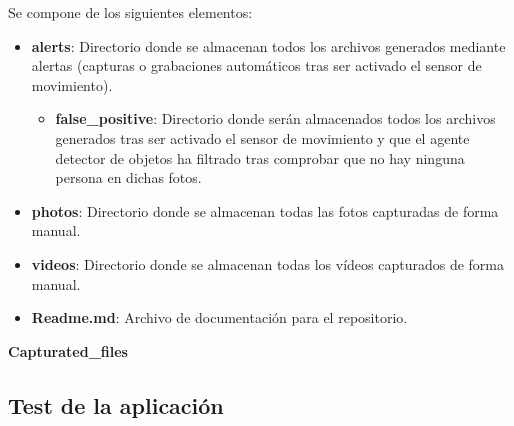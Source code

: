 Se compone de los siguientes elementos:

\vspace{-0.5cm}

\begin{itemize}
\item \textbf{alerts}: Directorio donde se almacenan todos los archivos generados mediante alertas (capturas o grabaciones automáticos tras ser activado el sensor de movimiento).

	\begin{itemize}
	\item \textbf{false\_positive}: Directorio donde serán almacenados todos los archivos generados tras ser activado el sensor de movimiento y que el agente detector de objetos ha filtrado tras comprobar que no hay ninguna persona en dichas fotos.
	\end{itemize}

\item \textbf{photos}: Directorio donde se almacenan todas las fotos capturadas de forma manual.

\item \textbf{videos}: Directorio donde se almacenan todas los vídeos capturados de forma manual.

\item \textbf{Readme.md}: Archivo de documentación para el repositorio.

\end{itemize}

\textbf{Capturated\_files}

\newpage

\subsection{Test de la aplicación}